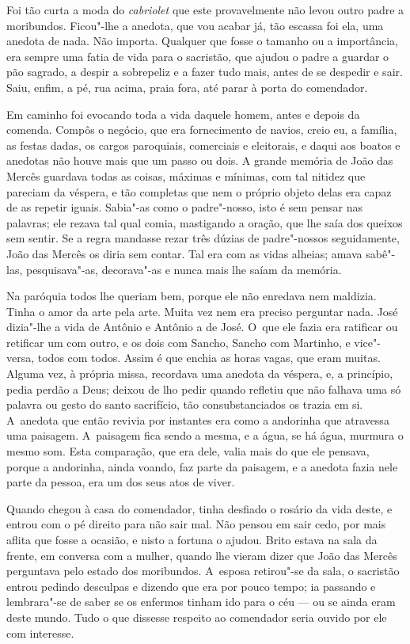 \begin{linenumbers}
Foi tão curta a moda do \emph{cabriolet} que este provavelmente não
levou outro padre a moribundos. Ficou"-lhe a anedota, que vou acabar já,
tão escassa foi ela, uma anedota de nada. Não importa. Qualquer que
fosse o tamanho ou a importância, era sempre uma fatia de vida para o
sacristão, que ajudou o padre a guardar o pão sagrado, a despir a
sobrepeliz e a fazer tudo mais, antes de se despedir e sair. Saiu,
enfim, a pé, rua acima, praia fora, até parar à porta do comendador.

Em caminho foi evocando toda a vida daquele homem, antes e depois da
comenda. Compôs o negócio, que era fornecimento de navios, creio eu, a
família, as festas dadas, os cargos paroquiais, comerciais e eleitorais,
e daqui aos boatos e anedotas não houve mais que um passo ou dois. A
grande memória de João das Mercês guardava todas as coisas, máximas e
mínimas, com tal nitidez que pareciam da véspera, e tão completas que
nem o próprio objeto delas era capaz de as repetir iguais. Sabia"-as como
o padre"-nosso, isto é sem pensar nas palavras; ele rezava tal qual
comia, mastigando a oração, que lhe saía dos queixos sem sentir. Se a
regra mandasse rezar três dúzias de padre"-nossos seguidamente, João das
Mercês os diria sem contar. Tal era com as vidas alheias; amava
sabê"-las, pesquisava"-as, decorava"-as e nunca mais lhe saíam da memória.

Na paróquia todos lhe queriam bem, porque ele não enredava nem maldizia.
Tinha o amor da arte pela arte. Muita vez nem era preciso perguntar
nada. José dizia"-lhe a vida de Antônio e Antônio a de José. O~que ele
fazia era ratificar ou retificar um com outro, e os dois com Sancho,
Sancho com Martinho, e vice"-versa, todos com todos. Assim é que enchia
as horas vagas, que eram muitas. Alguma vez, à própria missa, recordava
uma anedota da véspera, e, a princípio, pedia perdão a Deus; deixou de
lho pedir quando refletiu que não falhava uma só palavra ou gesto do
santo sacrifício, tão consubstanciados os trazia em si. A~anedota que
então revivia por instantes era como a andorinha que atravessa uma
paisagem. A~paisagem fica sendo a mesma, e a água, se há água, murmura o
mesmo som. Esta comparação, que era dele, valia mais do que ele pensava,
porque a andorinha, ainda voando, faz parte da paisagem, e a anedota
fazia nele parte da pessoa, era um dos seus atos de viver.

Quando chegou à casa do comendador, tinha desfiado o rosário da vida
deste, e entrou com o pé direito para não sair mal. Não pensou em sair
cedo, por mais aflita que fosse a ocasião, e nisto a fortuna o ajudou.
Brito estava na sala da frente, em conversa com a mulher, quando lhe
vieram dizer que João das Mercês perguntava pelo estado dos moribundos.
A~esposa retirou"-se da sala, o sacristão entrou pedindo desculpas e
dizendo que era por pouco tempo; ia passando e lembrara"-se de saber se
os enfermos tinham ido para o céu --- ou se ainda eram deste mundo. Tudo
o que dissesse respeito ao comendador seria ouvido por ele com
interesse.


\end{linenumbers}
